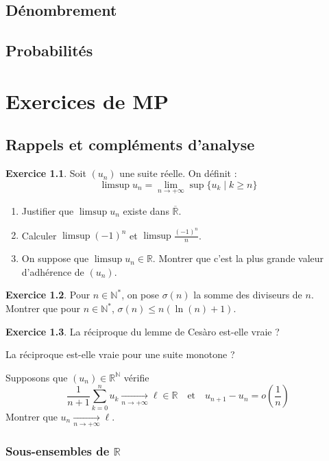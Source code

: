 \documentclass[12pt,a4paper]{book}
\theoremstyle{definition}
\newtheorem{exo}{Exercice}[section]
\theoremstyle{remark}
\newcommand{\N}{\mathbb{N}}
\newcommand{\R}{\mathbb{R}}
\begin{document}
\chapter{Dénombrement}

\chapter{Probabilités}

\part{Exercices de MP}

\chapter{Rappels et compléments d'analyse}

\begin{exo}
    Soit $(u_n)$ une suite réelle. On définit :
    \[\limsup u_n = \lim_{n\to +\infty} \sup \{u_k \mid k \ge n\}\]
    \begin{enumerate}
        \item Justifier que $\limsup u_n$ existe dans $\overline{\R}$.
        \item Calculer $\limsup (-1)^n$ et $\limsup \frac{(-1)^n}{n}$.
        \item On suppose que $\limsup u_n \in \R$. Montrer que c'est la plus grande valeur d'adhérence de $(u_n)$.
    \end{enumerate}
\end{exo}

\begin{exo}
    Pour $n \in  \N^*$, on pose $\sigma(n)$ la somme des diviseurs de $n$. Montrer que pour $n \in \N^*$, $\sigma (n) \le n (\ln(n) + 1)$.
\end{exo}

\begin{exo}
    \item La réciproque du lemme de Cesàro est-elle vraie ?
    \item La réciproque est-elle vraie pour une suite monotone ?
    \item Supposons que $(u_n) \in \R^\N$ vérifie
    \[\frac{1}{n+1} \sum_{k=0}^n u_k \xrightarrow[n \to +\infty]{} \ell \in \R \quad \text{et} \quad u_{n+1} - u_n = o\left(\frac{1}{n}\right)\]
    Montrer que $u_n \xrightarrow[n\to + \infty]{} \ell$.
\end{exo}

\section{Sous-ensembles de $\R$}
\end{document}

